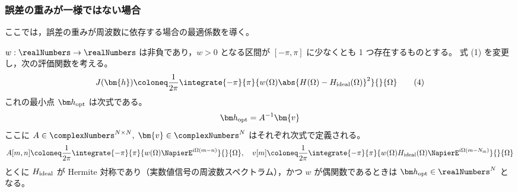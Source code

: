         \subsubsection{誤差の重みが一様ではない場合}
            ここでは，誤差の重みが周波数に依存する場合の最適係数を導く。
            \begin{shadebox}
                $w:\realNumbers\to\realNumbers$ は非負であり，$w>0$ となる区間が $[-\pi,\pi]$ に少なくとも 1 つ存在するものとする。
                式 (1) を変更し，次の評価関数を考える。
                \[ J(\bm{h}) \coloneq \frac{1}{2\pi}\integrate{-\pi}{\pi}{w(\Omega)\abs{H(\Omega)-\Hideal(\Omega)}^2}{}{\Omega}\tag{4} \]
                これの最小点 $\vhOpt$ は次式である。
                \[ \vhOpt = A^{-1}\bm{v} \]
                ここに $A\in\complexNumbers^{N\times N},\;\bm{v}\in\complexNumbers^N$ はそれぞれ次式で定義される。
                \[ A[m,n] \coloneq \frac{1}{2\pi}\integrate{-\pi}{\pi}{w(\Omega)\NapierE^{i\Omega(m-n)}}{}{\Omega},\quad v[m] \coloneq \frac{1}{2\pi}\integrate{-\pi}{\pi}{w(\Omega)\Hideal(\Omega)\NapierE^{i\Omega (m-\Nm)}}{}{\Omega} \]
                とくに $H_\text{ideal}$ が Hermite 対称であり（実数値信号の周波数スペクトラム），かつ $w$ が偶関数であるときは $\vhOpt\in\realNumbers^N$ となる。
            \end{shadebox}
